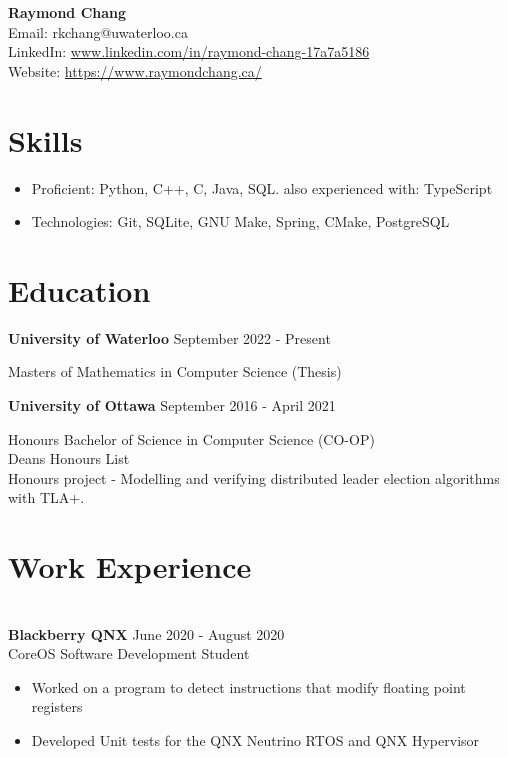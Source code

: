 \documentclass{article}
\begin{document}
\begin{center}
    {\huge\textbf{Raymond Chang}} \\
    Email: rkchang@uwaterloo.ca \\
    LinkedIn: \url{www.linkedin.com/in/raymond-chang-17a7a5186} \\
    Website: \url{https://www.raymondchang.ca/} \\ \end{center}

\section{Skills} \hrulefill \begin{itemize}[noitemsep] \item Proficient: Python, C++, C, Java, SQL.
          also experienced with: TypeScript
    \item Technologies: Git, SQLite, GNU Make, Spring, CMake, PostgreSQL
\end{itemize}

\smallskip

\section{Education} \hrulefill

\textbf{University of Waterloo} \hfill September 2022 - Present

Masters of Mathematics in Computer Science (Thesis)

\hfill

\textbf{University of Ottawa} \hfill September 2016 - April 2021

Honours Bachelor of Science in Computer Science (CO-OP) \\ Deans Honours List \\ Honours project - Modelling and verifying distributed leader election algorithms with TLA+.
\smallskip

\section{Work Experience}

\hrulefill \\
\textbf{Blackberry QNX} \hfill June 2020 - August 2020 \\
CoreOS Software Development Student
\begin{itemize}[noitemsep]
    \item Worked on a program to detect instructions that modify floating point registers
    \item Developed Unit tests for the QNX Neutrino RTOS and QNX Hypervisor
\end{itemize}
\end{document}
